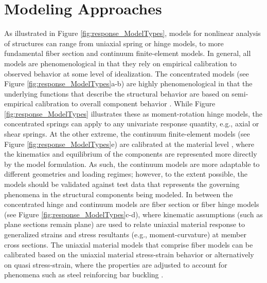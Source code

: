\section{Modeling Approaches}
\label{sec:resp_struct_methods}

As illustrated in Figure \ref{fig:response_ModelTypes}, models for nonlinear analysis of structures can range from uniaxial spring or hinge models, to more fundamental fiber section and continuum finite-element models. In general, all models are phenomenological in that they rely on empirical calibration to observed behavior at some level of idealization. The concentrated models (see Figure \ref{fig:response_ModelTypes}a-b) are highly phenomenological in that the underlying functions that describe the structural behavior are based on semi-empirical calibration to overall component behavior \cite[e.g.][]{ibarra2005hysteretic, folz2001saws, lowes2003modeling, do2018damage}. While Figure \ref{fig:response_ModelTypes} illustrates these as moment-rotation hinge models, the concentrated springs can apply to any univariate response quantity, e.g., axial or shear springs. At the other extreme, the continuum finite-element models (see Figure \ref{fig:response_ModelTypes}e) are calibrated at the material level \cite[e.g.][]{lemaitre1990mechanics, dettmer2004theoretical, lee1998plasticdamage, maekawa2003nonlinear}, where the kinematics and equilibrium of the components are represented more directly by the model formulation. As such, the continuum models are more adaptable to different geometries and loading regimes; however, to the extent possible, the models should be validated against test data that represents the governing phenomena in the structural components being modeled. In between the concentrated hinge and continuum models are fiber section or fiber hinge models (see Figure \ref{fig:response_ModelTypes}c-d), where kinematic assumptions (such as plane sections remain plane) are used to relate uniaxial material response to generalized strains and stress resultants (e.g., moment-curvature) at member cross sections. The uniaxial material models that comprise fiber models can be calibrated based on the uniaxial material stress-strain behavior \citep[e.g.,][]{mander1988theoretical, dodd1995model, menegotto1973method} or alternatively on quasi stress-strain, where the properties are adjusted to account for phenomena such as steel reinforcing bar buckling \citep[e.g.,][]{kunnath2009nonlinear,dhakal2002pathdependent}.

